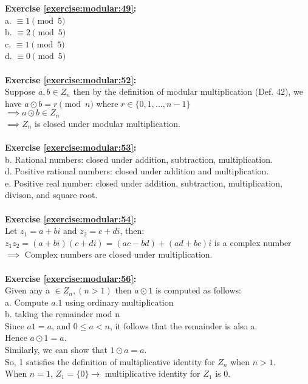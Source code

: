 \textbf{Exercise \ref{exercise:modular:49}:}\\
a. $\equiv 1 \pmod{5}$\\
b. $\equiv 2 \pmod{5}$\\
c. $\equiv 1 \pmod{5}$\\
d. $\equiv 0 \pmod{5}$\\
\\
\textbf{Exercise \ref{exercise:modular:52}:}\\
Suppose $a,b \in Z_n$ then by the definition of modular multiplication (Def. 42), we have $a \odot b =r \pmod{n}$ where $r \in \{0,1,...,n-1\}$\\
$\implies a \odot b \in Z_n$\\
$\implies Z_n$ is closed under modular multiplication.\\
\\
\textbf{Exercise \ref{exercise:modular:53}:}\\
b. Rational numbers: closed under addition, subtraction, multiplication.\\
d. Positive rational numbers: closed under addition and multiplication.\\
e. Positive real number: closed under addition, subtraction, multiplication, divison, and square root.\\
\\
\textbf{Exercise \ref{exercise:modular:54}:}\\
Let $z_1=a+bi$ and $z_2=c+di$, then:\\
$z_1z_2=(a+bi)(c+di)=(ac-bd)+(ad+bc)i$ is a complex number\\
$\implies$  Complex numbers are closed under multiplication.\\
\\
\textbf{Exercise \ref{exercise:modular:56}:}\\
Given any a $\in Z_n, (n>1)$ then $a \odot 1$ is computed as follows:\\
a. Compute $a.1$ using ordinary multiplication\\
b. taking the remainder mod n \\
Since $a1=a$, and $0 \le a <n$, it follows that the remainder is also a.\\
Hence $a \odot 1=a$.\\
Similarly, we can show that $1 \odot a=a$.\\
So, 1 satisfies the definition of multiplicative identity for $Z_n$ when $n>1$.\\
When $n=1$, $Z_1=\{0\} \to$ multiplicative identity for $Z_1$ is 0.\\
